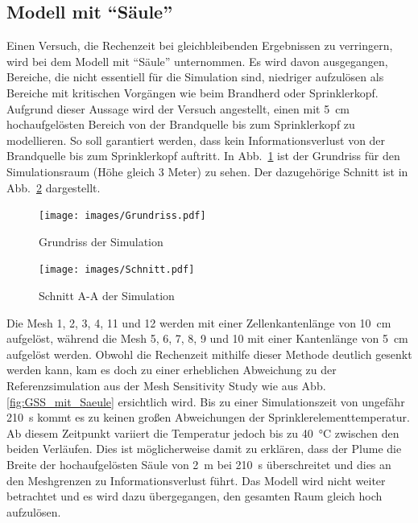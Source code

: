 \subsection{Modell mit "`Säule"'}
Einen Versuch, die Rechenzeit bei gleichbleibenden Ergebnissen zu verringern, wird bei dem Modell mit "`Säule"' unternommen. Es wird davon ausgegangen, Bereiche, die nicht essentiell für die Simulation sind, niedriger aufzulösen als Bereiche mit kritischen Vorgängen wie \zB beim Brandherd oder Sprinklerkopf. 
Aufgrund dieser Aussage wird der Versuch angestellt, einen mit 5~cm hochaufgelösten Bereich von der Brandquelle bis zum Sprinklerkopf zu modellieren. So soll garantiert werden, dass kein Informationsverlust von der Brandquelle bis zum Sprinklerkopf auftritt. In Abb.~\ref{fig:Grundriss} ist der Grundriss für den Simulationsraum (Höhe gleich 3 Meter) zu sehen. Der dazugehörige Schnitt ist in Abb.~\ref{fig:Schnitt} dargestellt. 
\begin{figure}
    \centering
    \texttt{[image: images/Grundriss.pdf]}
    \caption{Grundriss der Simulation}
    \label{fig:Grundriss}
\end{figure}
\begin{figure}
    \centering
    \texttt{[image: images/Schnitt.pdf]}
    \caption{Schnitt A-A der Simulation}
    \label{fig:Schnitt}
\end{figure}
Die Mesh 1, 2, 3, 4, 11 und 12 werden mit einer Zellenkantenlänge von 10~cm aufgelöst, während die Mesh 5, 6, 7, 8, 9 und 10 mit einer Kantenlänge von 5~cm aufgelöst werden. Obwohl die Rechenzeit mithilfe dieser Methode deutlich gesenkt werden kann, kam es doch zu einer erheblichen Abweichung zu der Referenzsimulation aus der Mesh Sensitivity Study wie aus Abb. \ref{fig:GSS_mit_Saeule} ersichtlich wird. Bis zu einer Simulationszeit von ungefähr 210~s kommt es zu keinen großen Abweichungen der Sprinklerelementtemperatur. Ab diesem Zeitpunkt variiert die Temperatur jedoch bis zu 40~°C zwischen den beiden Verläufen. Dies ist möglicherweise damit zu erklären, dass der Plume die Breite der hochaufgelösten Säule von 2~m bei 210~s überschreitet und dies an den Meshgrenzen zu Informationsverlust führt. Das Modell wird nicht weiter betrachtet und es wird dazu übergegangen, den gesamten Raum gleich hoch aufzulösen.
